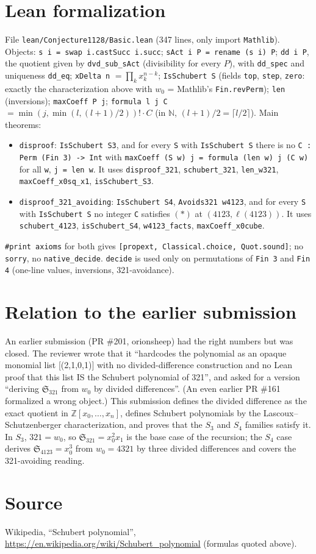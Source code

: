 \documentclass[11pt]{article}
\theoremstyle{definition}
\newcommand{\Sch}{\mathfrak S}
\begin{document}
\section{Lean formalization}
File \texttt{lean/Conjecture1128/Basic.lean} (347 lines, only import \texttt{Mathlib}).
Objects: \texttt{s i = swap i.castSucc i.succ}; \texttt{sAct i P = rename (s i) P};
\texttt{dd i P}, the quotient given by \texttt{dvd\_sub\_sAct} (divisibility for every $P$),
with \texttt{dd\_spec} and uniqueness \texttt{dd\_eq}; \texttt{xDelta n}
$=\prod_k x_k^{n-k}$; \texttt{IsSchubert S} (fields \texttt{top}, \texttt{step},
\texttt{zero}: exactly the characterization above with $w_0$ = Mathlib's \texttt{Fin.revPerm});
\texttt{len} (inversions); \texttt{maxCoeff P j}; \texttt{formula l j C}
$=\min(j,\min(l,(l+1)/2))!\cdot C$ (in $\mathbb N$, $(l+1)/2=\lceil l/2\rceil$).
Main theorems:
\begin{itemize}
\item \texttt{disproof}: \texttt{IsSchubert S3}, and for every \texttt{S} with
  \texttt{IsSchubert S} there is no \texttt{C : Perm (Fin 3) -> Int} with
  \texttt{maxCoeff (S w) j = formula (len w) j (C w)} for all \texttt{w}, \texttt{j = len w}.
  It uses \texttt{disproof\_321}, \texttt{schubert\_321}, \texttt{len\_w321},
  \texttt{maxCoeff\_x0sq\_x1}, \texttt{isSchubert\_S3}.
\item \texttt{disproof\_321\_avoiding}: \texttt{IsSchubert S4}, \texttt{Avoids321 w4123}, and for
  every \texttt{S} with \texttt{IsSchubert S} no integer \texttt{C} satisfies $(\ast)$ at
  $(4123,\ell(4123))$. It uses \texttt{schubert\_4123}, \texttt{isSchubert\_S4},
  \texttt{w4123\_facts}, \texttt{maxCoeff\_x0cube}.
\end{itemize}
\texttt{\#print axioms} for both gives \texttt{[propext, Classical.choice, Quot.sound]}; no
\texttt{sorry}, no \texttt{native\_decide}. \texttt{decide} is used only on permutations of
\texttt{Fin 3} and \texttt{Fin 4} (one-line values, inversions, 321-avoidance).

\section{Relation to the earlier submission}
An earlier submission (PR \#201, orionsheep) had the right numbers but was closed. The reviewer
wrote that it ``hardcodes the polynomial as an opaque monomial list [(2,1,0,1)] with no
divided-difference construction and no Lean proof that this list IS the Schubert polynomial of
321'', and asked for a version ``deriving $\Sch_{321}$ from $w_0$ by divided differences''.
(An even earlier PR \#161 formalized a wrong object.) This submission defines the divided
difference as the exact quotient in $\mathbb Z[x_0,\dots,x_n]$, defines Schubert polynomials by
the Lascoux--Schutzenberger characterization, and proves that the $S_3$ and $S_4$ families
satisfy it. In $S_3$, $321=w_0$, so $\Sch_{321}=x_0^2x_1$ is the base case of the recursion;
the $S_4$ case derives $\Sch_{4123}=x_0^3$ from $w_0=4321$ by three divided differences and
covers the 321-avoiding reading.

\section*{Source}
Wikipedia, ``Schubert polynomial'', \url{https://en.wikipedia.org/wiki/Schubert_polynomial}
(formulas quoted above).
\end{document}
